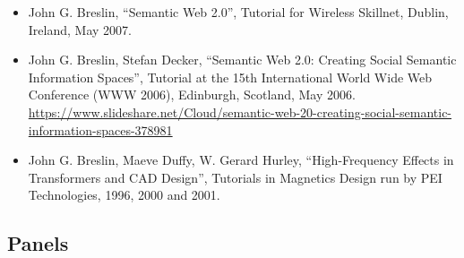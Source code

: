 \documentclass[10pt,a4paper]{res} %
\begin{document}
\begin{resume}
\begin{itemize}
\item John G. Breslin, ``Semantic Web 2.0'', Tutorial for Wireless Skillnet, Dublin, Ireland, May 2007. %
\item John G. Breslin, Stefan Decker, ``Semantic Web 2.0: Creating Social Semantic Information Spaces'', Tutorial at the 15th International World Wide Web Conference (WWW 2006), Edinburgh, Scotland, May 2006. \url{https://www.slideshare.net/Cloud/semantic-web-20-creating-social-semantic-information-spaces-378981}
\item John G. Breslin, Maeve Duffy, W. Gerard Hurley, ``High-Frequency Effects in Transformers and CAD Design'', Tutorials in Magnetics Design run by PEI Technologies, 1996, 2000 and 2001. %
\end{itemize}

\subsection*{Panels}


\end{resume}
\end{document}
